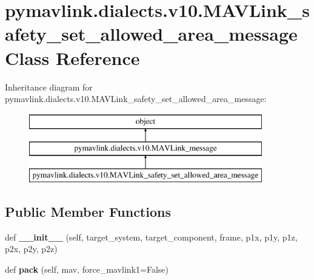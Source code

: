 \hypertarget{classpymavlink_1_1dialects_1_1v10_1_1MAVLink__safety__set__allowed__area__message}{}\section{pymavlink.\+dialects.\+v10.\+M\+A\+V\+Link\+\_\+safety\+\_\+set\+\_\+allowed\+\_\+area\+\_\+message Class Reference}
\label{classpymavlink_1_1dialects_1_1v10_1_1MAVLink__safety__set__allowed__area__message}
Inheritance diagram for pymavlink.\+dialects.\+v10.\+M\+A\+V\+Link\+\_\+safety\+\_\+set\+\_\+allowed\+\_\+area\+\_\+message\+:\begin{figure}[H]
\begin{center}
\leavevmode
\includegraphics[height=3.000000cm]{classpymavlink_1_1dialects_1_1v10_1_1MAVLink__safety__set__allowed__area__message}
\end{center}
\end{figure}
\subsection*{Public Member Functions}
\begin{DoxyCompactItemize}
\item 
\mbox{\label{classpymavlink_1_1dialects_1_1v10_1_1MAVLink__safety__set__allowed__area__message_ae002eb6459135fc1011ec8c6ea795e4f}} 
def {\bfseries \+\_\+\+\_\+init\+\_\+\+\_\+} (self, target\+\_\+system, target\+\_\+component, frame, p1x, p1y, p1z, p2x, p2y, p2z)
\item 
\mbox{\label{classpymavlink_1_1dialects_1_1v10_1_1MAVLink__safety__set__allowed__area__message_a929f4639408cac949306d48f968a5136}} 
def {\bfseries pack} (self, mav, force\+\_\+mavlink1=False)
\end{DoxyCompactItemize}
